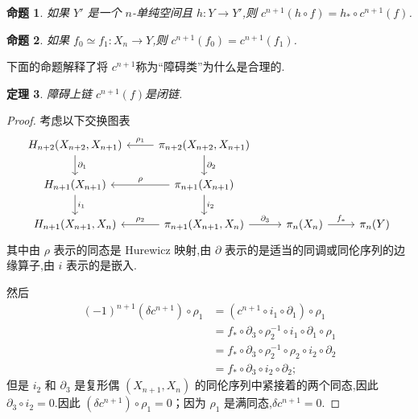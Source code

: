 \documentclass{ctexart}
\theoremstyle{plain}
\newtheorem{theorem}{定理}[section]
\newtheorem{proposition}[theorem]{命题}
\theoremstyle{definition}
\begin{document}
        \begin{proposition}
            如果 $Y'$ 是一个 $n$-单纯空间且 $h : Y \to Y'$,则 $c^{n+1}(h \circ f) = h_* \circ c^{n+1}(f)$. 
        \end{proposition}
            
        \begin{proposition}
            如果 $f_0 \simeq f_1 : X_n \to Y$,则 $c^{n+1}(f_0) = c^{n+1}(f_1)$. 
        \end{proposition}
        
        下面的命题解释了将 $c^{n+1}$称为``障碍类''为什么是合理的.

        \begin{theorem}
            \label{thm:obstruction cochain is closed}
            障碍上链 $c^{n+1}(f)$是闭链.
        \end{theorem}

        \begin{proof}
            考虑以下交换图表
            \begin{equation*}
                \begin{tikzcd}
                    H_{n+2}(X_{n+2}, X_{n+1}) \arrow[leftarrow]{r}{\rho_1} \arrow{d}{\partial_1} & \pi_{n+2}(X_{n+2}, X_{n+1}) \arrow{d}{\partial_2} \\
                    H_{n+1}(X_{n+1}) \arrow[leftarrow]{r}{\rho} \arrow{d}{i_1} & \pi_{n+1}(X_{n+1}) \arrow{d}{i_2} \\
                    H_{n+1}(X_{n+1}, X_n) \arrow[leftarrow]{r}{\rho_2} & \pi_{n+1}(X_{n+1}, X_n) \arrow{r}{\partial_3} & \pi_n(X_n) \arrow{r}{f_*} & \pi_n(Y)
                    \end{tikzcd}
            \end{equation*}
            其中由 $\rho$ 表示的同态是 Hurewicz 映射,由 $\partial$ 表示的是适当的同调或同伦序列的边缘算子,由 $i$ 表示的是嵌入.

            

            然后
            \begin{equation*}
              \begin{aligned}
                (-1)^{n+1} (\delta c^{n+1}) \circ \rho_1 &= (c^{n+1} \circ i_1 \circ \partial_1) \circ \rho_1 \\
                & = f_* \circ \partial_3 \circ \rho_2^{-1} \circ i_1 \circ \partial_1 \circ \rho_1 \\
                & = f_* \circ \partial_3 \circ \rho_2^{-1} \circ \rho_2 \circ i_2 \circ \partial_2 \\
                & = f_* \circ \partial_3 \circ i_2 \circ \partial_2;
              \end{aligned}
            \end{equation*}
            但是 $i_2$ 和 $\partial_3$ 是复形偶 $(X_{n+1}, X_n)$ 的同伦序列中紧接着的两个同态,因此 $\partial_3 \circ i_2 = 0$.因此 $(\delta c^{n+1}) \circ \rho_1 = 0$；因为 $\rho_1$ 是满同态,$\delta c^{n+1} = 0$.
        \end{proof}
\end{document}
